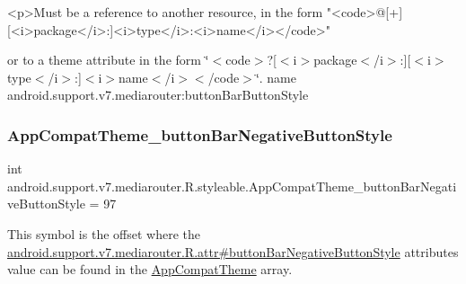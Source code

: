 \begin{DoxyVerb}      <p>Must be a reference to another resource, in the form "<code>@[+][<i>package</i>:]<i>type</i>:<i>name</i></code>"
\end{DoxyVerb}
 or to a theme attribute in the form \char`\"{}$<$code$>$?\mbox{[}$<$i$>$package$<$/i$>$\+:\mbox{]}\mbox{[}$<$i$>$type$<$/i$>$\+:\mbox{]}$<$i$>$name$<$/i$>$$<$/code$>$\char`\"{}.  name android.\+support.\+v7.\+mediarouter\+:button\+Bar\+Button\+Style \mbox{\label{classandroid_1_1support_1_1v7_1_1mediarouter_1_1R_1_1styleable_a5149daf27bddf85d912f992f8fa8acd1}} 
\subsubsection{\texorpdfstring{App\+Compat\+Theme\+\_\+button\+Bar\+Negative\+Button\+Style}{AppCompatTheme\_buttonBarNegativeButtonStyle}}
{\footnotesize\ttfamily int android.\+support.\+v7.\+mediarouter.\+R.\+styleable.\+App\+Compat\+Theme\+\_\+button\+Bar\+Negative\+Button\+Style = 97\hspace{0.3cm}{\ttfamily [static]}}

This symbol is the offset where the \hyperlink{classandroid_1_1support_1_1v7_1_1mediarouter_1_1R_1_1attr_ad8e53cbfb0fdd49ba7b5aa27a8566904}{android.\+support.\+v7.\+mediarouter.\+R.\+attr\#button\+Bar\+Negative\+Button\+Style} attribute\textquotesingle{}s value can be found in the \hyperlink{classandroid_1_1support_1_1v7_1_1mediarouter_1_1R_1_1styleable_a4e3d3900c75d49aeb2f283cac00214d6}{App\+Compat\+Theme} array.

